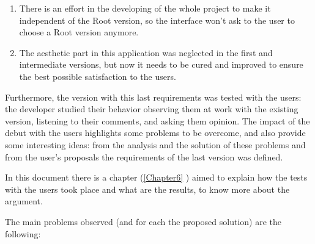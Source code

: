 \begin{enumerate}
\item
There is an effort in the developing of the whole project to make it independent of the Root version, so the interface won't ask to the user to choose a Root version anymore. 

\item
The aesthetic part in this application was neglected in the first and intermediate versions, but now it needs to be cured and improved to ensure the best possible satisfaction to the users. 

\end{enumerate}
 
Furthermore, the version with this last requirements was tested with the users: the developer studied their behavior observing them at work with the existing version, listening to their comments, and asking them opinion. The impact of the debut with the users highlights some problems to be overcome, and also provide some interesting ideas: from the analysis and the solution of these problems and from the user's proposals the requirements of the last version was defined. 

In this document there is a chapter (\ref{Chapter6} ) aimed to explain how the tests with the users took place and what are the results, to know more about the argument.

The main problems observed (and for each the proposed solution) are the following:

